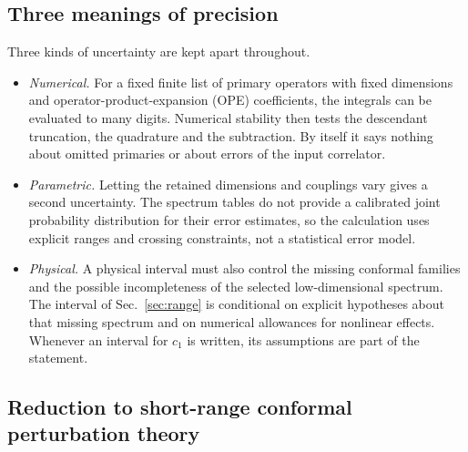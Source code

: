 \documentclass[11pt,a4paper]{article}
\numberwithin{equation}{section}
\begin{document}
\subsection{Three meanings of precision}\label{app:cone:precision}
Three kinds of uncertainty are kept apart throughout.
\begin{itemize}
\item \emph{Numerical.} For a fixed finite list of primary operators with fixed dimensions and operator-product-expansion
 (OPE) coefficients, the integrals can be evaluated to many digits. Numerical stability then tests the descendant
 truncation, the quadrature and the subtraction. By itself it says nothing about omitted primaries or about errors of
 the input correlator.
\item \emph{Parametric.} Letting the retained dimensions and couplings vary gives a second uncertainty. The spectrum
 tables do not provide a calibrated joint probability distribution for their error estimates, so the calculation uses
 explicit ranges and crossing constraints, not a statistical error model.
\item \emph{Physical.} A physical interval must also control the missing conformal families and the possible
 incompleteness of the selected low-dimensional spectrum. The interval of Sec.~\ref{sec:range} is conditional on
 explicit hypotheses about that missing spectrum and on numerical allowances for nonlinear effects. Whenever an
 interval for $c_1$ is written, its assumptions are part of the statement.
\end{itemize}

\subsection{Reduction to short-range conformal perturbation theory}\label{app:cone:cpt}
\end{document}

